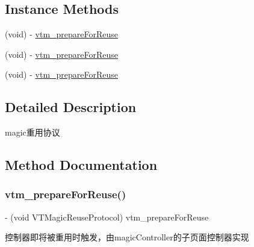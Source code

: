 \subsection*{Instance Methods}
\begin{DoxyCompactItemize}
\item 
(void) -\/ \mbox{\hyperlink{protocol_v_t_magic_reuse_protocol_01-p_a79dc4f79dcf1539853578c59391de0df}{vtm\+\_\+prepare\+For\+Reuse}}
\item 
(void) -\/ \mbox{\hyperlink{protocol_v_t_magic_reuse_protocol_01-p_a79dc4f79dcf1539853578c59391de0df}{vtm\+\_\+prepare\+For\+Reuse}}
\item 
(void) -\/ \mbox{\hyperlink{protocol_v_t_magic_reuse_protocol_01-p_a79dc4f79dcf1539853578c59391de0df}{vtm\+\_\+prepare\+For\+Reuse}}
\end{DoxyCompactItemize}


\subsection{Detailed Description}
magic重用协议 

\subsection{Method Documentation}
\mbox{\label{protocol_v_t_magic_reuse_protocol_01-p_a79dc4f79dcf1539853578c59391de0df}} 
\subsubsection{\texorpdfstring{vtm\+\_\+prepare\+For\+Reuse()}{vtm\_prepareForReuse()}\hspace{0.1cm}{\footnotesize\ttfamily [1/3]}}
{\footnotesize\ttfamily -\/ (void V\+T\+Magic\+Reuse\+Protocol) vtm\+\_\+prepare\+For\+Reuse \begin{DoxyParamCaption}{ }\end{DoxyParamCaption}\hspace{0.3cm}{\ttfamily [optional]}}

控制器即将被重用时触发，由magic\+Controller的子页面控制器实现 \mbox{\label{protocol_v_t_magic_reuse_protocol_01-p_a79dc4f79dcf1539853578c59391de0df}} 
